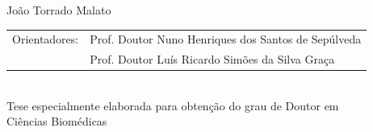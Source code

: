 \begin{center}
    \vspace{1.2cm}
    {\FontLb João Torrado Malato} \\

    \vspace{1.2cm}
    {\FontSn %
    \begin{tabular}{ll}
        Orientadores:   & Prof. Doutor Nuno Henriques dos Santos de Sepúlveda \\
                        & Prof. Doutor Luís Ricardo Simões da Silva Graça
    \end{tabular}} \\

    \vspace{1.6cm}
    {\FontSn Tese especialmente elaborada para obtenção do grau de Doutor em} \\
    \vspace{0.2cm}
    {\FontMb Ciências Biomédicas} \\
    
    \vfill
    {} \\
\end{center}
